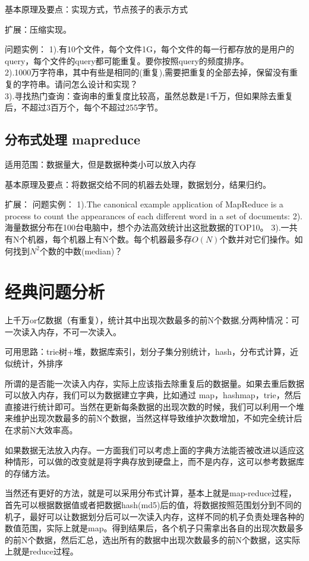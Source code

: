 基本原理及要点：实现方式，节点孩子的表示方式

扩展：压缩实现。

问题实例：
1).有10个文件，每个文件1G，每个文件的每一行都存放的是用户的query，每个文件的query都可能重复。要你按照query的频度排序。\\
2).1000万字符串，其中有些是相同的(重复),需要把重复的全部去掉，保留没有重复的字符串。请问怎么设计和实现？\\
3).寻找热门查询：查询串的重复度比较高，虽然总数是1千万，但如果除去重复后，不超过3百万个，每个不超过255字节。


\subsection{分布式处理 mapreduce}
适用范围：数据量大，但是数据种类小可以放入内存

基本原理及要点：将数据交给不同的机器去处理，数据划分，结果归约。

扩展：
问题实例：
1).The canonical example application of MapReduce is a process to count the appearances of
each different word in a set of documents:
2).海量数据分布在100台电脑中，想个办法高效统计出这批数据的TOP10。
3).一共有N个机器，每个机器上有N个数。每个机器最多存$O(N)$个数并对它们操作。如何找到$N^2$个数的中数(median)？

\section{经典问题分析}
上千万or亿数据（有重复），统计其中出现次数最多的前N个数据,分两种情况：可一次读入内存，不可一次读入。

可用思路：trie树+堆，数据库索引，划分子集分别统计，hash，分布式计算，近似统计，外排序

所谓的是否能一次读入内存，实际上应该指去除重复后的数据量。如果去重后数据可以放入内存，我们可以为数据建立字典，比如通过 
map，hashmap，trie，然后直接进行统计即可。当然在更新每条数据的出现次数的时候，我们可以利用一个堆来维护出现次数最多的前N个数据，当然这样导致维护次数增加，不如完全统计后在求前N大效率高。

如果数据无法放入内存。一方面我们可以考虑上面的字典方法能否被改进以适应这种情形，可以做的改变就是将字典存放到硬盘上，而不是内存，这可以参考数据库的存储方法。

当然还有更好的方法，就是可以采用分布式计算，基本上就是map-reduce过程，首先可以根据数据值或者把数据hash(md5)后的值，将数据按照范围划分到不同的机子，最好可以让数据划分后可以一次读入内存，这样不同的机子负责处理各种的数值范围，实际上就是map。得到结果后，各个机子只需拿出各自的出现次数最多的前N个数据，然后汇总，选出所有的数据中出现次数最多的前N个数据，这实际上就是reduce过程。

